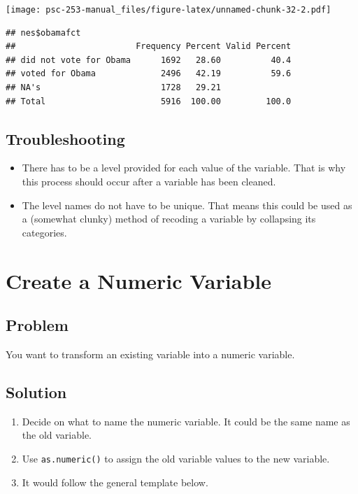 \documentclass[
]{book}
\providecommand{\tightlist}{%
  \setlength{\itemsep}{0pt}\setlength{\parskip}{0pt}}
\begin{document}
\texttt{[image: psc-253-manual\_files/figure-latex/unnamed-chunk-32-2.pdf]}

\begin{verbatim}
## nes$obamafct 
##                        Frequency Percent Valid Percent
## did not vote for Obama      1692   28.60          40.4
## voted for Obama             2496   42.19          59.6
## NA's                        1728   29.21              
## Total                       5916  100.00         100.0
\end{verbatim}

\hypertarget{troubleshooting-12}{%
\subsection{Troubleshooting}\label{troubleshooting-12}}

\begin{itemize}
\item
  There has to be a level provided for each value of the variable. That is why this process should occur after a variable has been cleaned.
\item
  The level names do not have to be unique. That means this could be used as a (somewhat clunky) method of recoding a variable by collapsing its categories.
\end{itemize}

\hypertarget{numeric}{%
\section{Create a Numeric Variable}\label{numeric}}

\hypertarget{problem-15}{%
\subsection{Problem}\label{problem-15}}

You want to transform an existing variable into a numeric variable.

\hypertarget{solution-15}{%
\subsection{Solution}\label{solution-15}}

\begin{enumerate}
\def\labelenumi{\arabic{enumi}.}
\tightlist
\item
  Decide on what to name the numeric variable. It could be the same name as the old variable.
\item
  Use \texttt{as.numeric()} to assign the old variable values to the new variable.
\item
  It would follow the general template below.
\end{enumerate}
\end{document}
